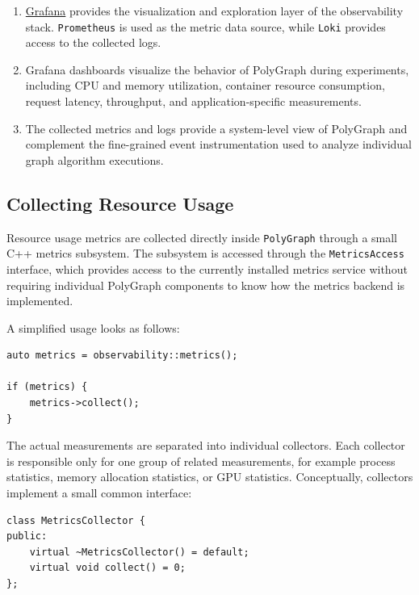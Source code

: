 \documentclass[11pt,a4paper]{article}
\begin{document}
\begin{enumerate}
    \item \href{https://grafana.com/}{Grafana} provides the visualization and
    exploration layer of the observability stack. \texttt{Prometheus} is used
    as the metric data source, while \texttt{Loki} provides access to the
    collected logs.

    \item Grafana dashboards visualize the behavior of PolyGraph during
    experiments, including CPU and memory utilization, container resource
    consumption, request latency, throughput, and application-specific
    measurements.

    \item The collected metrics and logs provide a system-level view of
    PolyGraph and complement the fine-grained event instrumentation used to
    analyze individual graph algorithm executions.
\end{enumerate}


\subsection{Collecting Resource Usage}
\label{sec:collecting-resource-usage}

Resource usage metrics are collected directly inside \texttt{PolyGraph} through a small
C++ metrics subsystem. The subsystem is accessed through the
\texttt{MetricsAccess} interface, which provides access to the currently
installed metrics service without requiring individual PolyGraph components to
know how the metrics backend is implemented.

A simplified usage looks as follows:

\begin{lstlisting}[style=cpp]
auto metrics = observability::metrics();

if (metrics) {
    metrics->collect();
}
\end{lstlisting}

The actual measurements are separated into individual collectors. Each
collector is responsible only for one group of related measurements, for
example process statistics, memory allocation statistics, or GPU statistics.
Conceptually, collectors implement a small common interface:

\begin{lstlisting}[style=cpp]
class MetricsCollector {
public:
    virtual ~MetricsCollector() = default;
    virtual void collect() = 0;
};
\end{lstlisting}
\end{document}

